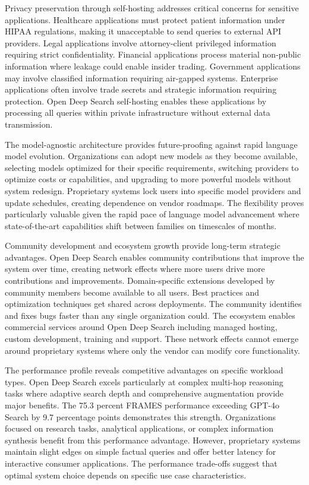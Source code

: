 Privacy preservation through self-hosting addresses critical concerns for sensitive applications. Healthcare applications must protect patient information under HIPAA regulations, making it unacceptable to send queries to external API providers. Legal applications involve attorney-client privileged information requiring strict confidentiality. Financial applications process material non-public information where leakage could enable insider trading. Government applications may involve classified information requiring air-gapped systems. Enterprise applications often involve trade secrets and strategic information requiring protection. Open Deep Search self-hosting enables these applications by processing all queries within private infrastructure without external data transmission.

The model-agnostic architecture provides future-proofing against rapid language model evolution. Organizations can adopt new models as they become available, selecting models optimized for their specific requirements, switching providers to optimize costs or capabilities, and upgrading to more powerful models without system redesign. Proprietary systems lock users into specific model providers and update schedules, creating dependence on vendor roadmaps. The flexibility proves particularly valuable given the rapid pace of language model advancement where state-of-the-art capabilities shift between families on timescales of months.

Community development and ecosystem growth provide long-term strategic advantages. Open Deep Search enables community contributions that improve the system over time, creating network effects where more users drive more contributions and improvements. Domain-specific extensions developed by community members become available to all users. Best practices and optimization techniques get shared across deployments. The community identifies and fixes bugs faster than any single organization could. The ecosystem enables commercial services around Open Deep Search including managed hosting, custom development, training and support. These network effects cannot emerge around proprietary systems where only the vendor can modify core functionality.

The performance profile reveals competitive advantages on specific workload types. Open Deep Search excels particularly at complex multi-hop reasoning tasks where adaptive search depth and comprehensive augmentation provide major benefits. The 75.3 percent FRAMES performance exceeding GPT-4o Search by 9.7 percentage points demonstrates this strength. Organizations focused on research tasks, analytical applications, or complex information synthesis benefit from this performance advantage. However, proprietary systems maintain slight edges on simple factual queries and offer better latency for interactive consumer applications. The performance trade-offs suggest that optimal system choice depends on specific use case characteristics.

